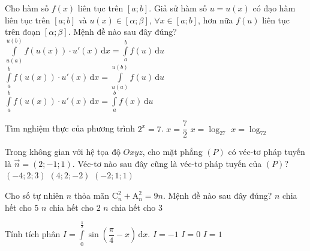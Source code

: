 \begin{ex}%
Cho hàm số $f(x)$ liên tục trên $[a;b]$. Giả sử hàm số $u=u(x)$ có đạo hàm liên tục trên $[a;b]$ và $u(x)\in[\alpha;\beta]$, $\forall x\in[a;b]$, hơn nữa $f(u)$ liên tục trên đoạn $[\alpha;\beta]$. Mệnh đề nào sau đây đúng?
{$\displaystyle\int\limits_{u(a)}^{u(b)}f(u(x))\cdot u'(x)\mathrm{\, d}x=\displaystyle\int\limits_a^b f(u)\mathrm{\, d}u$}
{\True $\displaystyle\int\limits_a^bf(u(x))\cdot u'(x)\mathrm{\, d}x=\displaystyle\int\limits_{u(a)}^{u(b)} f(u)\mathrm{\, d}u$}
{$\displaystyle\int\limits_a^bf(u(x))\cdot u'(x)\mathrm{\, d}x=\displaystyle\int\limits_a^b f(x)\mathrm{\, d}u$}
\end{ex}

\begin{ex}%
Tìm nghiệm thực của phương trình $2^x=7$.
{$x=\dfrac{7}{2}$}
{\True $x=\log_27$}
{$x=\log_72$}
\end{ex}

\begin{ex}%
Trong không gian với hệ tọa độ $Oxyz$, cho mặt phẳng $(P)$ có véc-tơ pháp tuyến là $\overrightarrow{n}=(2;-1;1)$. Véc-tơ nào sau đây cũng là véc-tơ pháp tuyến của $(P)$?
{$(-4;2;3)$}
{$(4;2;-2)$}
{$(-2;1;1)$}
\end{ex}

\begin{ex}%
Cho số tự nhiên $n$ thỏa mãn $\mathrm{C}_{n}^{2}+\mathrm{A}_{n}^{2}=9n$. Mệnh đề nào sau đây đúng?
{$n$ chia hết cho $5$}
{$n$ chia hết cho $2$}
{$n$ chia hết cho $3$}
\end{ex}

\begin{ex}%
Tính tích phân $I=\displaystyle\int\limits_0^{\tfrac{\pi}{2}}\sin\left(\dfrac{\pi}{4}-x\right)\mathrm{\, d}x$.
{$I=-1$}
{\True $I=0$}
{$I=1$}
\end{ex}

